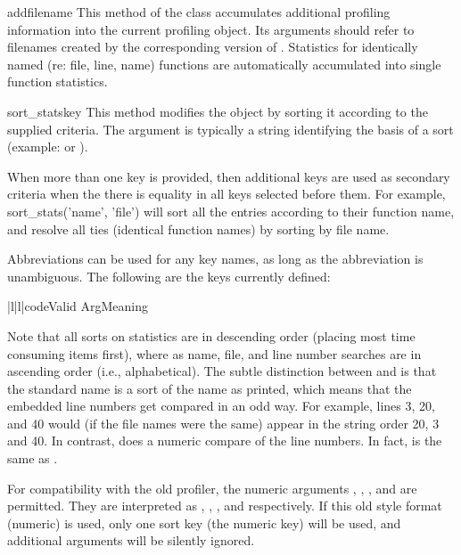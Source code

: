 \begin{funcdesc}{add}{filename}
This method of the  class accumulates additional profiling
information into the current profiling object.  Its arguments should
refer to filenames created by the corresponding version of
.  Statistics for identically named (re: file,
line, name) functions are automatically accumulated into single
function statistics.
\end{funcdesc}

\begin{funcdesc}{sort_stats}{key}
This method modifies the  object by sorting it according to the
supplied criteria.  The argument is typically a string identifying the
basis of a sort (example:  or ).

When more than one key is provided, then additional keys are used as
secondary criteria when the there is equality in all keys selected
before them.  For example, sort_stats('name', 'file') will sort all
the entries according to their function name, and resolve all ties
(identical function names) by sorting by file name.

Abbreviations can be used for any key names, as long as the
abbreviation is unambiguous.  The following are the keys currently
defined: 

\begin{tableii}{|l|l|}{code}{Valid Arg}{Meaning}
\end{tableii}

Note that all sorts on statistics are in descending order (placing
most time consuming items first), where as name, file, and line number
searches are in ascending order (i.e., alphabetical). The subtle
distinction between  and  is that the
standard name is a sort of the name as printed, which means that the
embedded line numbers get compared in an odd way.  For example, lines
3, 20, and 40 would (if the file names were the same) appear in the
string order 20, 3 and 40.  In contrast,  does a numeric
compare of the line numbers.  In fact,  is the
same as .

For compatibility with the old profiler, the numeric arguments
, , , and  are permitted.  They are
interpreted as , , , and
 respectively.  If this old style format (numeric)
is used, only one sort key (the numeric key) will be used, and
additional arguments will be silently ignored.
\end{funcdesc}



